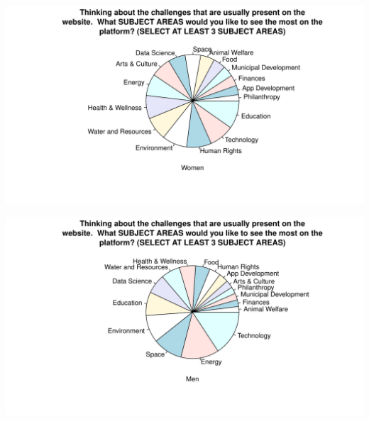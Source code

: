 \documentclass[12pt, titlepage]{article}
\newenvironment{Shaded}{\begin{snugshade}}{\end{snugshade}}
\newcommand{\KeywordTok}[1]{\textcolor[rgb]{0.12,0.11,0.11}{\textbf{#1}}}
\newcommand{\DataTypeTok}[1]{\textcolor[rgb]{0.00,0.34,0.68}{#1}}
\newcommand{\DecValTok}[1]{\textcolor[rgb]{0.69,0.50,0.00}{#1}}
\newcommand{\StringTok}[1]{\textcolor[rgb]{0.75,0.01,0.01}{#1}}
\newcommand{\OperatorTok}[1]{\textcolor[rgb]{0.12,0.11,0.11}{#1}}
\newcommand{\NormalTok}[1]{\textcolor[rgb]{0.12,0.11,0.11}{#1}}
\begin{document}
\includegraphics{report_survey_files/figure-latex/unnamed-chunk-2-14.pdf}

\begin{Shaded}
\end{Shaded}

\includegraphics{report_survey_files/figure-latex/unnamed-chunk-2-15.pdf}


\end{document}
